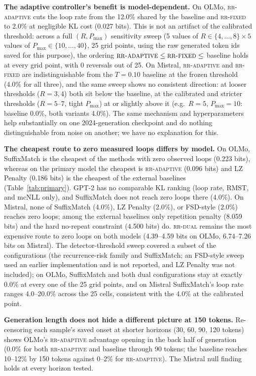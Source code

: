 \documentclass[make,article,submit,pdftex]{Definitions/mdpi}
\begin{document}
\textbf{The adaptive controller's benefit is model-dependent.} On OLMo, \textsc{rr-adaptive} cuts the loop rate from the 12.0\% shared by the baseline and \textsc{rr-fixed} to 2.0\% at negligible KL cost (0.027 bits). This is not an artifact of the calibrated threshold: across a full $(R,P_{\max})$ sensitivity sweep (5 values of $R\in\{4,\ldots,8\}\times5$ values of $P_{\max}\in\{10,\ldots,40\}$, 25 grid points, using the raw generated token ids saved for this purpose), the ordering $\textsc{rr-adaptive}\le\textsc{rr-fixed}\le$ baseline holds at every grid point, with 0 reversals out of 25. On Mistral, \textsc{rr-adaptive} and \textsc{rr-fixed} are indistinguishable from the $T{=}0.10$ baseline at the frozen threshold (4.0\% for all three), and the same sweep shows no consistent direction: at looser thresholds ($R{=}3,4$) both sit below the baseline, at the calibrated and stricter thresholds ($R{=}5$--$7$, tight $P_{\max}$) at or slightly above it (e.g.\ $R{=}5$, $P_{\max}{=}10$: baseline 0.0\%, both variants 4.0\%). The same mechanism and hyperparameters help substantially on one 2024-generation checkpoint and do nothing distinguishable from noise on another; we have no explanation for this.

\textbf{The cheapest route to zero measured loops differs by model.} On OLMo, SuffixMatch is the cheapest of the methods with zero observed loops (0.223 bits), whereas on the primary model the cheapest is \textsc{rr-adaptive} (0.096 bits) and LZ Penalty (0.186 bits) is the cheapest of the external baselines (Table~\ref{tab:primary}). GPT-2 has no comparable KL ranking (loop rate, RMST, and mcNLL only), and SuffixMatch does not reach zero loops there (4.0\%). On Mistral, none of SuffixMatch (4.0\%), LZ Penalty (2.0\%), or FSD-style (2.0\%) reaches zero loops; among the external baselines only repetition penalty (8.059 bits) and the hard no-repeat constraint (4.500 bits) do. \textsc{rr-dual} remains the most expensive route to zero loops on both models (4.39--4.59 bits on OLMo, 6.74--7.26 bits on Mistral). The detector-threshold sweep covered a subset of the configurations (the recurrence-risk family and SuffixMatch; an FSD-style sweep used an earlier implementation and is not reported, and LZ Penalty was not included); on OLMo, SuffixMatch and both dual configurations stay at exactly 0.0\% at every one of the 25 grid points, and on Mistral SuffixMatch's loop rate ranges 4.0--20.0\% across the 25 cells, consistent with the 4.0\% at the calibrated point.

\textbf{Generation length does not hide a different picture at 150 tokens.} Re-censoring each sample's saved onset at shorter horizons (30, 60, 90, 120 tokens) shows OLMo's \textsc{rr-adaptive} advantage opening in the back half of generation (0.0\% for both \textsc{rr-adaptive} and baseline through 90 tokens; the baseline reaches 10--12\% by 150 tokens against 0--2\% for \textsc{rr-adaptive}). The Mistral null finding holds at every horizon tested.
\end{document}
